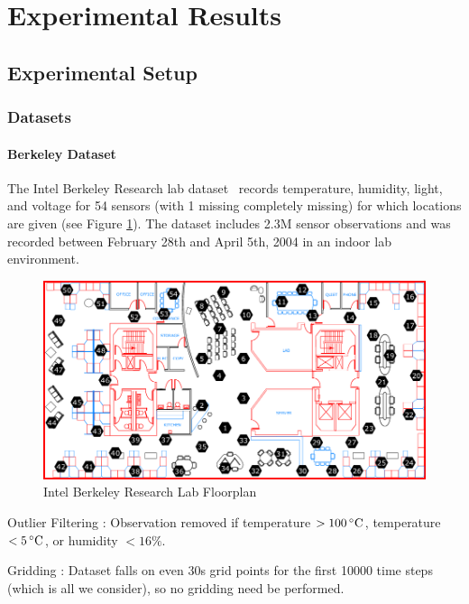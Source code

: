 \section{Experimental Results}  \label{sec:exp}

\subsection{Experimental Setup}

\subsubsection{Datasets}

\paragraph*{Berkeley Dataset}

The Intel Berkeley Research lab dataset~\cite{berkeley2004lab} records temperature, humidity, light, and voltage for 54 sensors (with 1 missing completely missing) for which locations are given (see Figure \ref{berkeley_lab}).
The dataset includes 2.3M sensor observations and was recorded between February 28th and April 5th, 2004 in an indoor lab environment.

\begin{figure}[H]
\centering
\includegraphics[scale=0.25]{berkeley_lab.png}
\caption{Intel Berkeley Research Lab Floorplan} \label{berkeley_lab}
\end{figure}

Outlier Filtering : Observation removed if temperature $> 100\,^{\circ}\mathrm{C}$, temperature $< 5\,^{\circ}\mathrm{C}$, or humidity $< 16\%$.

Gridding : Dataset falls on even 30s grid points for the first 10000 time steps (which is all we consider), so no gridding need be performed.


